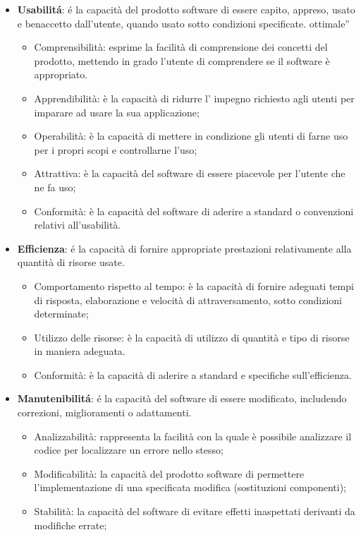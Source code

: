 \begin{itemize}
\begin{itemize}
\end{itemize}
\item \textbf{Usabilit\'a}: \'e la capacità del prodotto software di essere capito, appreso, usato e benaccetto dall'utente, quando usato sotto condizioni specificate.
ottimale”
\begin{itemize}
\item Comprensibilità: esprime la facilità di comprensione dei concetti del prodotto, mettendo in grado l'utente di comprendere se il software è appropriato.
\item Apprendibilità: è la capacità di ridurre l’ impegno richiesto agli utenti per imparare ad usare la sua applicazione;
\item Operabilità: è la capacità di mettere in condizione gli utenti di farne uso per i propri scopi e controllarne l’uso;
\item Attrattiva: è la capacità del software di essere piacevole per l'utente che ne fa uso;
\item Conformità: è la capacità del software di aderire a standard o convenzioni relativi all'usabilità.
\end{itemize}
\item \textbf{Efficienza}: \'e la capacità di fornire appropriate prestazioni relativamente alla quantità di risorse usate.
\begin{itemize}
\item Comportamento rispetto al tempo: è la capacità di fornire adeguati tempi di risposta, elaborazione e velocità di attraversamento, sotto condizioni determinate;
\item Utilizzo delle risorse: è la capacità di utilizzo di quantità e tipo di risorse in maniera adeguata.
\item Conformità: è la capacità di aderire a standard e specifiche sull'efficienza.
\end{itemize}
\item \textbf{Manutenibilit\'a}: \'e la capacità del software di essere modificato, includendo correzioni, miglioramenti o adattamenti.
\begin{itemize}
\item Analizzabilità: rappresenta la facilità con la quale è possibile analizzare il codice per localizzare un errore nello stesso;
\item Modificabilità: la capacità del prodotto software di permettere l'implementazione di una specificata modifica (sostituzioni componenti);
\item Stabilità: la capacità del software di evitare effetti inaspettati derivanti da modifiche errate;

\end{itemize}
\end{itemize}
